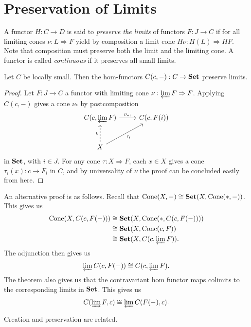 \section{Preservation of Limits}

\begin{definition}[Continuous]\label{dfn:5.3}
	A functor $H : C \to D$ is said to \emph{preserve the limits} of functors $F : J \to C$ if for all limiting cones $\nu : L \Rightarrow F$ yield by composition a limit cone $H\nu : H(L) \Rightarrow HF$. Note that composition must preserve both the limit and the limiting cone. A functor is called \emph{continuous} if it preserves all small limits.
\end{definition}

\begin{theorem}\label{thm:5.7}
	Let $C$ be locally small. Then the hom-functors $C(c,-): C \to \mathbf{Set} $ preserve limits.
\end{theorem}
\begin{proof}
	Let $F : J \to C$ a functor with limiting cone $\nu : \varprojlim F \Rightarrow F$. Applying $C(c,-)$ gives a cone $\nu _*$ by postcomposition
	\[\begin{tikzcd}[row sep = 2.5em, column sep = 2.5em]
	C(c,\varprojlim F)\ar["\nu_{*i}  ", r]  & C(c,F(i)) \\
	X\ar[" k ", dashed, u] \ar[" \tau _i "', ur]  & 
	\end{tikzcd}\]
	in $\mathbf{Set} $, with $i\in J$.  For any cone $\tau : X \Rightarrow F$, each $x\in X$ gives a cone $\tau _i(x): c \to F_i$ in $C$, and by universality of $\nu $ the proof can be concluded easily from here.
\end{proof}

An alternative proof is as follows. Recall that $\operatorname{Cone} (X,-)\cong \mathbf{Set} (X,\operatorname{Cone} (*,-))$. This gives us
\begin{align*}
	\operatorname{Cone} (X,C(c,F(-)))&\cong \mathbf{Set} (X,\operatorname{Cone} (*,C(c,F(-))))\\
					 &\cong \mathbf{Set} (X,\operatorname{Cone} (c,F))\\
					 &\cong \mathbf{Set} (X,C(c,\varprojlim F))
.\end{align*}
The adjunction then gives us
\[
	\varprojlim C(c,F(-))\cong C(c,\varprojlim F)
.\]
The theorem also gives us that the contravariant hom functor maps colimits to the corresponding limits in $\mathbf{Set} $. This gives us
\[
	C(\varinjlim F,c)\cong \varprojlim C(F(-),c)
.\]

Creation and preservation are related.

